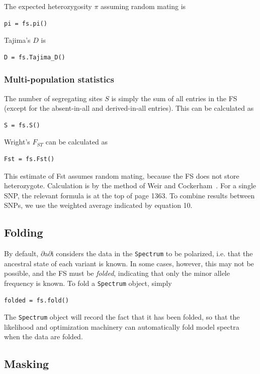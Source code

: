 \documentclass[12pt]{article}
\makeatletter
\newcommand{\dadi}{$\partial$a$\partial$i\xspace}
\newcommand{\py}[1]{\lstinline[language=Python, showstringspaces=False]@#1@}
\makeatother
\begin{document}
The expected heterozygosity $\pi$ assuming random mating is
\begin{lstlisting}
pi = fs.pi()
\end{lstlisting}

Tajima's $D$ is
\begin{lstlisting}
D = fs.Tajima_D()
\end{lstlisting}

\subsubsection{Multi-population statistics}

The number of segregating sites $S$ is simply the sum of all entries in the FS (except for the absent-in-all and derived-in-all entries).
This can be calculated as
\begin{lstlisting}
S = fs.S()
\end{lstlisting}

Wright's $F_{ST}$ can be calculated as
\begin{lstlisting}
Fst = fs.Fst()
\end{lstlisting}
This estimate of Fst assumes random mating, because the FS does not store heterozygote.
Calculation is by the method of Weir and Cockerham~\cite{bib:Weir1984}.
For a single SNP, the relevant formula is at the top of page 1363.
To combine results between SNPs, we use the weighted average indicated by equation 10.

\subsection{Folding}

By default, \dadi considers the data in the \py{Spectrum} to be polarized, i.e. that the ancestral state of each variant is known.
In some cases, however, this may not be possible, and the FS must be \emph{folded}, indicating that only the minor allele frequency is known.
To fold a \py{Spectrum} object, simply
\begin{lstlisting}
folded = fs.fold()
\end{lstlisting}
The \py{Spectrum} object will record the fact that it has been folded, so that the likelihood and optimization machinery can automatically fold model spectra when the data are folded.

\subsection{Masking}
\end{document}
